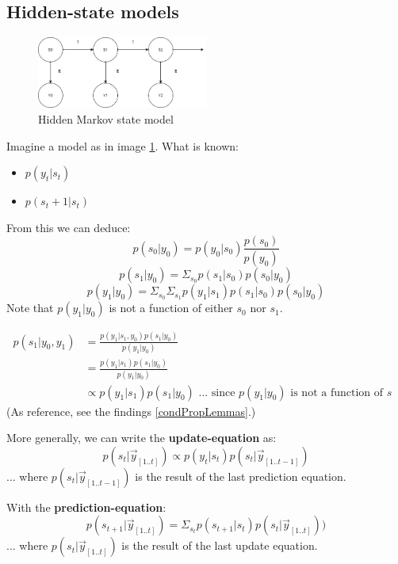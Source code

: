 \subsection{Hidden-state models}

\begin{figure} \label{hiddenMarkovStates}
    \caption{Hidden Markov state model}
    \centering
      \includegraphics[width=0.5\textwidth]{images/hidden_markov_states.jpg}
\end{figure}

Imagine a model as in image \ref{hiddenMarkovStates}.
What is known: 
\begin{itemize}
    \item $p(y_t|s_t)$
    \item $p(s_t+1|s_t)$
\end{itemize}

From this we can deduce:
$$ p(s_0|y_0) = p(y_0|s_0) \frac{p(s_0)}{p(y_0)} $$
$$ p(s_1|y_0) = \Sigma_{s_0} p(s_1|s_0) p(s_0|y_0) $$
$$ p(y_1|y_0) = \Sigma_{s_0} \Sigma_{s_1} p(y_1|s_1) p(s_1|s_0) p(s_0|y_0) $$
Note that $ p(y_1|y_0) $ is not a function of either $s_0$ nor $s_1$.

\begin{equation}
    \begin{aligned}
        p(s_1|y_0, y_1) &= \frac{ p(y_1|s_1, y_0) p(s_1|y_0) }{ p(y_1|y_0) } \\
                        &= \frac{ p(y_1|s_1) p(s_1|y_0) }{ p(y_1|y_0) } \\
                        & \propto p(y_1|s_1) p(s_1|y_0) \text{ ... since $p(y_1|y_0)$ is not a function of $s$ }
    \end{aligned}
\end{equation}
(As reference, see the findings \ref{condPropLemmas}.)

More generally, we can write the \textbf{update-equation} as:
\begin{equation}
    p(s_t | \vec{y}_{[1..t]}) \propto p(y_t | s_t) p(s_t | \vec{y}_{[1..t-1]})
\end{equation}
... where $p(s_t | \vec{y}_{[1..t-1]})$ is the result of the last prediction equation.

With the \textbf{prediction-equation}:
\begin{equation}
    p(s_{t+1} | \vec{y}_{[1..t]} ) = \Sigma_{s_t} p(s_{t+1} | s_t) p(s_t | \vec{y}_{[1..t]}) )
\end{equation}
... where $ p(s_t | \vec{y}_{[1..t]}) $ is the result of the last update equation.

